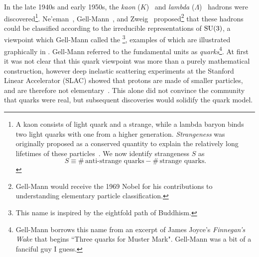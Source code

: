 In the late 1940s and early 1950s, the {\it kaon} ($K$)~\cite{rochester_evidence_1947}
 and {\it lambda} ($\Lambda$)~\cite{hopper_evidence_1950}
 hadrons were discovered\footnote{A kaon
consists of light quark and a strange, while a lambda baryon binds two light
quarks with one from a higher generation. {\it Strangeness} 
was originally proposed as a conserved quantity to explain the relatively long
lifetimes of these particles~\cite{pais_remarks_1952,gell-mann_isotopic_1953,
pais_baryon-meson-photon_1953,tadao_charge_1953}.
We now identify strangeness $S$ as
$$
  S\equiv\#\,\text{anti-strange quarks}-\#\,\text{strange quarks}.
$$}. Ne'eman~\cite{neeman_derivation_1961}, 
Gell-Mann~\cite{gell-mann_symmetries_1962}, and 
Zweig~\cite{zweig_su3_1964} proposed\footnote{Gell-Mann would receive the 1969
Nobel for his contributions to understanding elementary particle
classification.} that these hadrons could be classified
according to the irreducible representations of $\operatorname{SU}(3)$, a viewpoint which
Gell-Mann called the \footnote{This
name is inspired by the eightfold path of Buddhism.}, examples of which are 
illustrated graphically in . Gell-Mann
referred to the fundamental units as {\it quarks}\footnote{Gell-Mann borrows
this name from an excerpt of James Joyce's {\it Finnegan's Wake} that begins
``Three quarks for Muster Mark".
Gell-Mann was a bit of a fanciful guy I guess.}.
At first it was not clear that this quark viewpoint was more than a
purely mathematical construction, however deep inelastic 
scattering
experiments at the Stanford Linear Accelerator (SLAC) showed that
protons are made of smaller particles, and are therefore not 
elementary~\cite{bloom_high-energy_1969,breidenbach_observed_1969}.
This alone did not convince the community that quarks were real, but
subsequent discoveries would solidify the quark model.

